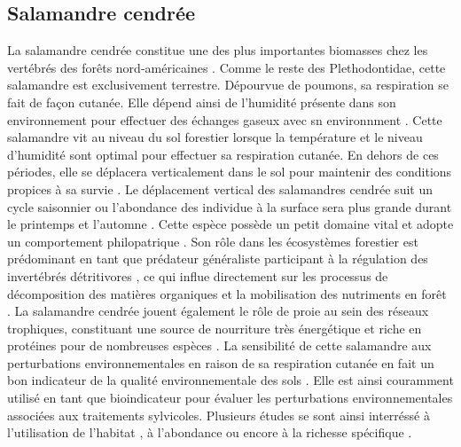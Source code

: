\subsection*{Salamandre cendrée}

La salamandre cendrée constitue une des plus importantes biomasses chez les vertébrés des forêts nord-américaines \citep{Burton1975Salamanderpopulations,Petranka1993Effectstimber,semlitschAbundanceBiomassProduction2014a}.
Comme le reste des Plethodontidae, cette salamandre est exclusivement terrestre. Dépourvue de poumons, sa respiration se fait de façon cutanée. 
Elle dépend ainsi de l'humidité présente dans son environnement pour effectuer des échanges gaseux avec sn environnment \citep{Heatwole1961RelationSubstratea}. 
Cette salamandre vit au niveau du sol forestier lorsque la température et le niveau d'humidité sont optimal pour effectuer sa respiration cutanée. 
En dehors de ces périodes, elle se déplacera verticalement dans le sol pour maintenir des conditions propices à sa survie \citep{Grizzell1949HibernationSite}.  
Le déplacement vertical des salamandres cendrée suit un cycle saisonnier ou l'abondance des individue à la surface sera plus grande durant le printemps et l'automne \citep{FraserEmpiricalEvaluation1976,Jaeger1980MicrohabitatsTerrestrial}.
Cette espèce possède un petit domaine vital et adopte un comportement philopatrique \citep{Yurewicz2004ResourceAvailability}.
Son rôle dans les écosystèmes forestier est prédominant en tant que prédateur généraliste participant à la régulation des invertébrés détritivores \citep{Burton1975Energyflow,Hickerson2017Easternredbacked,Walton2013Topdownregulation}, 
ce qui influe directement sur les processus de décomposition des matières organiques et la mobilisation des nutriments en forêt \citep{Burton1975Energyflow,Wyman1998Experimentalassessment}. 
La salamandre cendrée jouent également le rôle de proie au sein des réseaux trophiques, constituant une source de nourriture très énergétique et riche en protéines pour de nombreuses espèces \citep{Burton1975Energyflow,Pough1987abundancesalamanders}.
La sensibilité de cette salamandre aux perturbations environnementales en raison de sa respiration cutanée en fait un bon indicateur de la qualité environnementale des sols \citep{Welsh2001caseusing}.
Elle est ainsi couramment utilisé en tant que bioindicateur pour évaluer les perturbations environnementales associées aux traitements sylvicoles.
Plusieurs études se sont ainsi interréssé à l'utilisation de l'habitat \citep{Baecher2018Environmentalgradients,gibbsDistributionWoodlandAmphibians1998,Heatwole1962EnvironmentalFactors,Mossman2019Twosalamander}, 
à l'abondance \citep{Harpole1999Effectsseven,Hocking2013Effectsexperimental,Homyack2009Longtermeffects,Grialou2000effectsforest,Mazerolle2021Woodlandsalamander} 
ou encore à la richesse spécifique \citep{Petranka1993Effectstimber,Welsh2001caseusing}.


